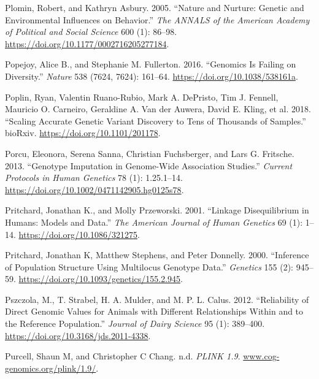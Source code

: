 \documentclass[
]{book}
\newlength{\cslhangindent}
\newlength{\cslentryspacingunit} %
\newenvironment{CSLReferences}[2] %
 {%
  \setlength{\parindent}{0pt}
  \ifodd #1
  \let\oldpar\par
  \def\par{\hangindent=\cslhangindent\oldpar}
  \fi
  \setlength{\parskip}{#2\cslentryspacingunit}
 }%
 {}
\begin{document}
\begin{CSLReferences}{1}{0}
\leavevmode{}%
Plomin, Robert, and Kathryn Asbury. 2005. {``Nature and {Nurture}: {Genetic} and {Environmental Influences} on {Behavior}.''} \emph{The ANNALS of the American Academy of Political and Social Science} 600 (1): 86--98. \url{https://doi.org/10.1177/0002716205277184}.

\leavevmode{}%
Popejoy, Alice B., and Stephanie M. Fullerton. 2016. {``Genomics Is Failing on Diversity.''} \emph{Nature} 538 (7624, 7624): 161--64. \url{https://doi.org/10.1038/538161a}.

\leavevmode{}%
Poplin, Ryan, Valentin Ruano-Rubio, Mark A. DePristo, Tim J. Fennell, Mauricio O. Carneiro, Geraldine A. Van der Auwera, David E. Kling, et al. 2018. {``Scaling Accurate Genetic Variant Discovery to Tens of Thousands of Samples.''} {bioRxiv}. \url{https://doi.org/10.1101/201178}.

\leavevmode{}%
Porcu, Eleonora, Serena Sanna, Christian Fuchsberger, and Lars G. Fritsche. 2013. {``Genotype {Imputation} in {Genome-Wide Association Studies}.''} \emph{Current Protocols in Human Genetics} 78 (1): 1.25.1--14. \url{https://doi.org/10.1002/0471142905.hg0125s78}.

\leavevmode{}%
Pritchard, Jonathan K., and Molly Przeworski. 2001. {``Linkage {Disequilibrium} in {Humans}: {Models} and {Data}.''} \emph{The American Journal of Human Genetics} 69 (1): 1--14. \url{https://doi.org/10.1086/321275}.

\leavevmode{}%
Pritchard, Jonathan K, Matthew Stephens, and Peter Donnelly. 2000. {``Inference of {Population Structure Using Multilocus Genotype Data}.''} \emph{Genetics} 155 (2): 945--59. \url{https://doi.org/10.1093/genetics/155.2.945}.

\leavevmode{}%
Pszczola, M., T. Strabel, H. A. Mulder, and M. P. L. Calus. 2012. {``Reliability of Direct Genomic Values for Animals with Different Relationships Within and to the Reference Population.''} \emph{Journal of Dairy Science} 95 (1): 389--400. \url{https://doi.org/10.3168/jds.2011-4338}.

\leavevmode{}%
Purcell, Shaun M, and Christopher C Chang. n.d. \emph{{PLINK} 1.9}. \href{https://www.cog-genomics.org/plink/1.9/}{www.cog-genomics.org/plink/1.9/}.


\end{CSLReferences}
\end{document}
